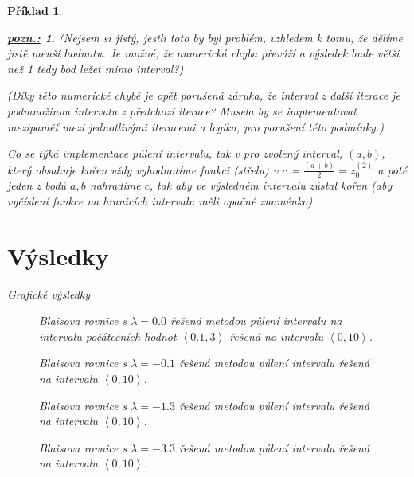 \documentclass{article}
\newtheorem{example}{Příklad}
\newtheorem*{remark}{\underline{\it pozn.:}}
\begin{document}
\begin{example}
\begin{remark}
		(Nejsem si jistý, jestli toto by byl problém, vzhledem k tomu, že dělíme jistě menší hodnotu. Je možné, že numerická chyba převáží a výsledek bude větší než 1 tedy bod ležet mimo interval?)

		(Díky této numerické chybě je opět porušená záruka, že interval z další iterace je podmnožinou intervalu z předchozí iterace? Musela by se implementovat mezipaměť mezi jednotlivými iteracemi a logika, pro porušení této podmínky.)
	\end{remark}

	Co se týká implementace půlení intervalu, tak v pro zvolený interval, $(a,b)$, který obsahuje kořen vždy vyhodnotíme funkci (střelu) v $ c \coloneqq \frac{(a+b)}{2} = z^{(2)}_{0}$ a poté jeden z bodů $a,b$ nahradíme $c$, tak aby ve výsledném intervalu zůstal kořen (aby vyčíslení funkce na hranicích intervalu měli opačné znaménko).\pagebreak

	\section*{Výsledky}
	Grafické výsledky

    \begin{figure}[h]
	\centering
    \def\svgwidth{\textwidth}
	
    \caption{Blaisova rovnice s $\lambda = 0.0$ řešená metodou půlení intervalu na intervalu počátečních hodnot $\left<0.1,3 \right>$ řešená na intervalu $\left<0,10 \right>$.}
    \end{figure}

    \begin{figure}[h]
	\centering
    \def\svgwidth{\textwidth}
	
    \caption{Blaisova rovnice s $\lambda = -0.1$ řešená metodou půlení intervalu řešená na intervalu $\left<0,10 \right>$.}
    \end{figure}

    \begin{figure}[h]
	\centering
    \def\svgwidth{\textwidth}
	
    \caption{Blaisova rovnice s $\lambda = -1.3$ řešená metodou půlení intervalu řešená na intervalu $\left<0,10 \right>$.}
    \end{figure}

    \begin{figure}[h]
	\centering
    \def\svgwidth{\textwidth}
	
    \caption{Blaisova rovnice s $\lambda = -3.3$ řešená metodou půlení intervalu řešená na intervalu $\left<0,10 \right>$.}
    \end{figure}


\end{example}
\end{document}
